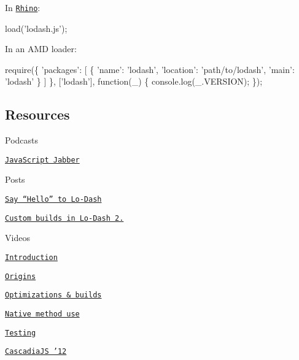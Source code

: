 In \href{http://www.mozilla.org/rhino/}{\tt Rhino}\+:


\begin{DoxyCode}
load(\textcolor{stringliteral}{'lodash.js'});
\end{DoxyCode}


In an A\+M\+D loader\+:


\begin{DoxyCode}
require(\{
  \textcolor{stringliteral}{'packages'}: [
    \{ \textcolor{stringliteral}{'name'}: \textcolor{stringliteral}{'lodash'}, \textcolor{stringliteral}{'location'}: \textcolor{stringliteral}{'path/to/lodash'}, \textcolor{stringliteral}{'main'}: \textcolor{stringliteral}{'lodash'} \}
  ]
\},
[\textcolor{stringliteral}{'lodash'}], \textcolor{keyword}{function}(\_) \{
  console.log(\_.VERSION);
\});
\end{DoxyCode}


\subsection*{Resources}


\begin{DoxyItemize}
\item Podcasts
\begin{DoxyItemize}
\item \href{http://javascriptjabber.com/079-jsj-lo-dash-with-john-david-dalton/}{\tt Java\+Script Jabber}
\end{DoxyItemize}
\item Posts
\begin{DoxyItemize}
\item \href{http://kitcambridge.be/blog/say-hello-to-lo-dash/}{\tt Say “\+Hello” to Lo-\/\+Dash}
\item \href{http://kitcambridge.be/blog/custom-builds-in-lo-dash-2-dot-0/}{\tt Custom builds in Lo-\/\+Dash 2.}
\end{DoxyItemize}
\item Videos
\begin{DoxyItemize}
\item \href{https://vimeo.com/44154599}{\tt Introduction}
\item \href{https://vimeo.com/44154600}{\tt Origins}
\item \href{https://vimeo.com/44154601}{\tt Optimizations \& builds}
\item \href{https://vimeo.com/48576012}{\tt Native method use}
\item \href{https://vimeo.com/45865290}{\tt Testing}
\item \href{http://www.youtube.com/watch?v=dpPy4f_SeEk}{\tt Cascadia\+J\+S ’12}
\end{DoxyItemize}
\end{DoxyItemize}

